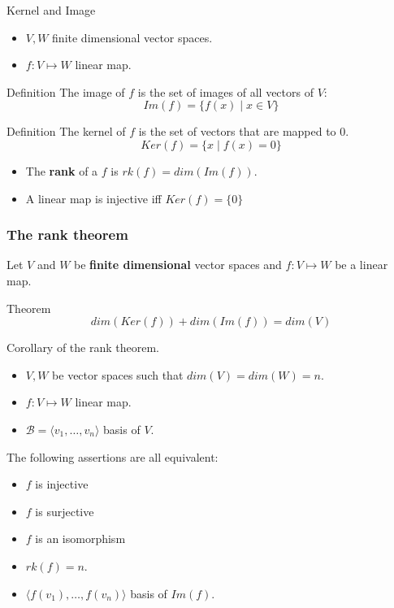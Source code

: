 \documentclass{beamer}
\begin{document}
\begin{frame}{Kernel and Image}
  \begin{itemize}
  \item $V, W$ finite dimensional vector spaces.
  \item $f: V \mapsto W$ linear map.
  \end{itemize}

  \begin{block}{Definition}
    The image of $f$ is the set of images of all vectors of $V$:
    \[Im(f) = \{ f(x) \mid x \in V \} \]
  \end{block}

  \begin{block}{Definition}
    The kernel of $f$ is the set of vectors that are mapped to $0$.
    \[Ker(f) = \{ x \mid f(x) = 0\}\]
  \end{block}

  \begin{itemize}
  \item The {\textbf{rank}} of a $f$ is $rk(f)=dim(Im(f))$.
  \item A linear map is injective iff $Ker(f) = \{0\}$
  \end{itemize}  
\end{frame}

\begin{frame}
  \frametitle{The rank theorem}
  Let $V$ and $W$ be {\bf finite dimensional} vector spaces and $f: V \mapsto W$ be a linear map.

  \begin{block}{Theorem}
    \[dim(Ker(f)) + dim(Im(f)) = dim(V)\]
  \end{block}
\end{frame}

\begin{frame}
  \begin{block}{Corollary of the rank theorem.}
    \begin{itemize}
    \item $V, W$ be vector spaces such that $dim(V) = dim(W) = n$.
    \item $f: V \mapsto W$ linear map.
    \item $\mathcal{B} = \langle v_1, \dots, v_n\rangle$ basis of $V$.
    \end{itemize}
      The following assertions are all equivalent:
      \begin{itemize}
      \item $f$ is injective
      \item $f$ is surjective
      \item $f$ is an isomorphism
      \item $rk(f) = n$.
      \item $\langle f(v_1), \dots, f(v_n) \rangle$ basis of $Im(f)$.
      \end{itemize}
  \end{block}
\end{frame}
\end{document}
